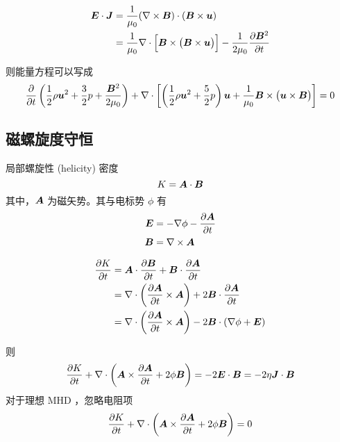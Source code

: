 \begin{equation}\begin{aligned}
\bm{E} \cdot \bm{J} &= \frac{1}{\mu_0} (\nabla \times {\bm{B}}) \cdot (\bm{B} \times \bm{u}) \\
&= \frac{1}{\mu_0} \nabla \cdot {\Big[ \bm{B} \times \big(\bm{B} \times \bm{u} \big) \Big]}
    - \frac{1}{2 \mu_0} \frac{\partial {\bm{B}^2}}{\partial {t}}
\end{aligned}\end{equation}

则能量方程可以写成
\begin{equation}
\frac{\partial {}}{\partial {t}}\left(
    \frac{1}{2} \rho \bm{u}^2
    + \frac{3}{2} p
    + \frac{\bm{B}^2}{2 \mu_0}
\right)
+ \nabla \cdot {\left[
    \left( \frac{1}{2} \rho \bm{u}^2 + \frac{5}{2} p  \right) \bm{u}
    + \frac{1}{\mu_0} \bm{B} \times \big( \bm{u} \times \bm{B} \big)
\right]} = 0
\end{equation}

\subsection{磁螺旋度守恒}

局部螺旋性 (helicity) 密度
\begin{equation}
    K = \bm{A} \cdot \bm{B}
\end{equation}
其中，$\bm{A}$ 为磁矢势。其与电标势 $\phi$ 有
\begin{align}
    \bm{E} &= - \nabla {\phi} - \frac{\partial {\bm{A}}}{\partial {t}} \\
    \bm{B} &= \nabla \times {\bm{A}}
\end{align}

\begin{equation}\begin{aligned}
\frac{\partial {K}}{\partial {t}} &= \bm{A} \cdot \frac{\partial {\bm{B}}}{\partial {t}}
+ \bm{B} \cdot \frac{\partial {\bm{A}}}{\partial {t}} \\
&= \nabla \cdot {\left( \frac{\partial {\bm{A}}}{\partial {t}} \times \bm{A} \right)}
+ 2 \bm{B} \cdot \frac{\partial {\bm{A}}}{\partial {t}} \\
&= \nabla \cdot {\left( \frac{\partial {\bm{A}}}{\partial {t}} \times \bm{A} \right)}
- 2 \bm{B} \cdot \left(\nabla {\phi} + \bm{E}\right)
\end{aligned}\end{equation}

则
\begin{equation}
\frac{\partial {K}}{\partial {t}} + \nabla \cdot {\left(
    \bm{A} \times \frac{\partial {\bm{A}}}{\partial {t}} + 2 \phi \bm{B}
\right)} = - 2 \bm{E} \cdot \bm{B} = - 2 \eta \bm{J} \cdot \bm{B}
\end{equation}
对于理想 MHD ，忽略电阻项
\begin{equation}
\frac{\partial {K}}{\partial {t}} + \nabla \cdot {\left(
    \bm{A} \times \frac{\partial {\bm{A}}}{\partial {t}} + 2 \phi \bm{B}
\right)} = 0
\end{equation}

